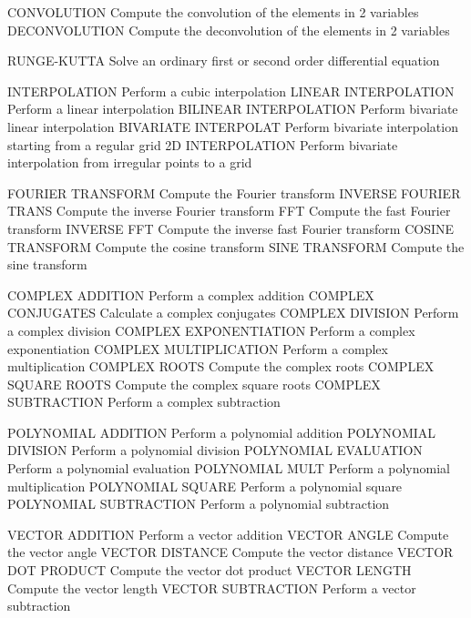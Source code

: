       CONVOLUTION            Compute the convolution of the elements in
                             2 variables
      DECONVOLUTION          Compute the deconvolution of the elements
                             in 2 variables
 
      RUNGE-KUTTA            Solve an ordinary first or second order
                             differential equation
 
      INTERPOLATION          Perform a cubic interpolation
      LINEAR INTERPOLATION   Perform a linear interpolation
      BILINEAR INTERPOLATION Perform bivariate linear interpolation
      BIVARIATE INTERPOLAT   Perform bivariate interpolation starting
                             from a regular grid
      2D INTERPOLATION       Perform bivariate interpolation from
                             irregular points to a grid
 
      FOURIER TRANSFORM      Compute the Fourier transform
      INVERSE FOURIER TRANS  Compute the inverse Fourier transform
      FFT                    Compute the fast Fourier transform
      INVERSE FFT            Compute the inverse fast Fourier transform
      COSINE TRANSFORM       Compute the cosine transform
      SINE TRANSFORM         Compute the sine transform
 
      COMPLEX ADDITION       Perform a complex addition
      COMPLEX CONJUGATES     Calculate a complex conjugates
      COMPLEX DIVISION       Perform a complex division
      COMPLEX EXPONENTIATION Perform a complex exponentiation
      COMPLEX MULTIPLICATION Perform a complex multiplication
      COMPLEX ROOTS          Compute the complex roots
      COMPLEX SQUARE ROOTS   Compute the complex square roots
      COMPLEX SUBTRACTION    Perform a complex subtraction
 
      POLYNOMIAL ADDITION    Perform a polynomial addition
      POLYNOMIAL DIVISION    Perform a polynomial division
      POLYNOMIAL EVALUATION  Perform a polynomial evaluation
      POLYNOMIAL MULT        Perform a polynomial multiplication
      POLYNOMIAL SQUARE      Perform a polynomial square
      POLYNOMIAL SUBTRACTION Perform a polynomial subtraction
 
      VECTOR ADDITION        Perform a vector addition
      VECTOR ANGLE           Compute the vector angle
      VECTOR DISTANCE        Compute the vector distance
      VECTOR DOT PRODUCT     Compute the vector dot product
      VECTOR LENGTH          Compute the vector length
      VECTOR SUBTRACTION     Perform a vector subtraction
 

